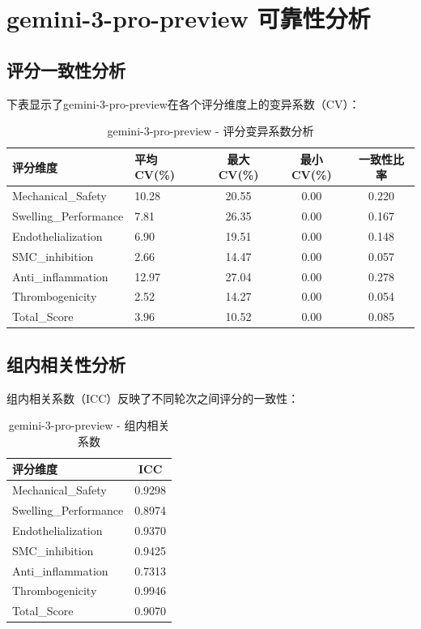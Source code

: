 \documentclass[12pt,a4paper]{article}
\begin{document}
\newpage


\section{gemini-3-pro-preview 可靠性分析}

\subsection{评分一致性分析}

下表显示了gemini-3-pro-preview在各个评分维度上的变异系数（CV）：

\begin{table}[H]
\centering
\caption{gemini-3-pro-preview - 评分变异系数分析}
\begin{tabular}{llccc}
\toprule
\textbf{评分维度} & \textbf{平均CV(\%)} & \textbf{最大CV(\%)} & \textbf{最小CV(\%)} & \textbf{一致性比率} \\
\midrule
Mechanical\_Safety & 10.28 & 20.55 & 0.00 & 0.220 \\
Swelling\_Performance & 7.81 & 26.35 & 0.00 & 0.167 \\
Endothelialization & 6.90 & 19.51 & 0.00 & 0.148 \\
SMC\_inhibition & 2.66 & 14.47 & 0.00 & 0.057 \\
Anti\_inflammation & 12.97 & 27.04 & 0.00 & 0.278 \\
Thrombogenicity & 2.52 & 14.27 & 0.00 & 0.054 \\
Total\_Score & 3.96 & 10.52 & 0.00 & 0.085 \\
\bottomrule
\end{tabular}
\end{table}

\subsection{组内相关性分析}

组内相关系数（ICC）反映了不同轮次之间评分的一致性：

\begin{table}[H]
\centering
\caption{gemini-3-pro-preview - 组内相关系数}
\begin{tabular}{lc}
\toprule
\textbf{评分维度} & \textbf{ICC} \\
\midrule
Mechanical\_Safety & 0.9298 \\
Swelling\_Performance & 0.8974 \\
Endothelialization & 0.9370 \\
SMC\_inhibition & 0.9425 \\
Anti\_inflammation & 0.7313 \\
Thrombogenicity & 0.9946 \\
Total\_Score & 0.9070 \\
\bottomrule
\end{tabular}
\end{table}
\end{document}
